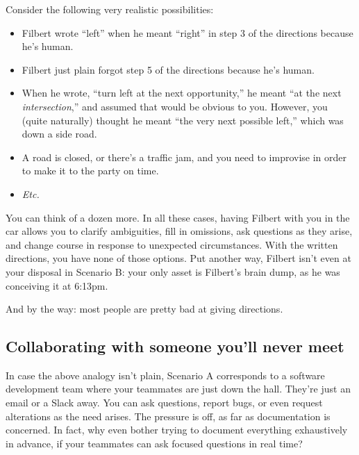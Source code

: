 Consider the following very realistic possibilities:

\begin{itemize}
\itemsep.1em

\item Filbert wrote ``left'' when he meant ``right'' in step 3 of the directions
because he's human.

\item Filbert just plain forgot step 5 of the directions because he's human.

\item When he wrote, ``turn left at the next opportunity,'' he meant ``at the
next \textit{intersection},'' and assumed that would be obvious to you.
However, you (quite naturally) thought he meant ``the very next possible
left,'' which was down a side road.

\item A road is closed, or there's a traffic jam, and you need to improvise
in order to make it to the party on time.

\item \textit{Etc.}

\end{itemize}

You can think of a dozen more. In all these cases, having Filbert with you in
the car allows you to clarify ambiguities, fill in omissions, ask questions as
they arise, and change course in response to unexpected circumstances. With
the written directions, you have none of those options. Put another way,
Filbert isn't even at your disposal in Scenario B: your only asset is
Filbert's brain dump, as he was conceiving it at 6:13pm.

And by the way: most people are pretty bad at giving directions.

\subsection{Collaborating with someone you'll never meet}

In case the above analogy isn't plain, Scenario A corresponds to a software
development team where your teammates are just down the hall. They're just an
email or a Slack away. You can ask questions, report bugs, or even request
alterations as the need arises. The pressure is off, as far as documentation
is concerned. In fact, why even bother trying to document everything
exhaustively in advance, if your teammates can ask focused questions in real
time?


